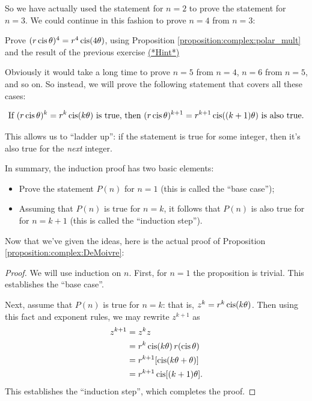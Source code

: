 \noindent So we have actually used the statement for $n=2$ to prove the statement for $n=3$. We could continue in this fashion to prove $n=4$ from $n=3$:

\begin{exercise}{29} Prove $(r\operatorname{cis}\theta)^{4}=r^{4}\operatorname{cis}(4\theta)$, using Proposition
\ref{proposition:complex:polar_mult} and the result of the previous exercise 
\hyperref[sec:complex:hints]{(*Hint*)}
\end{exercise}

 \noindent Obviously it would take a long time to prove $n=5$ from $n=4$, $n=6$ from $n=5$, and so on. So instead, we will prove the following statement that covers all these cases:

\[ \text{If } (r\operatorname{cis}\theta)^{k}=r^{k}\operatorname{cis}(k\theta) \mbox{ is true, then } (r\operatorname{cis}\theta)^{k+1}=r^{k+1}\operatorname{cis}((k+1)\theta) \mbox{ is also true.} \]

This allows us to ``ladder up'': if the statement is true for some integer, then it's also true for the {\it next} integer.

In summary, the induction proof has two basic elements:
\begin{itemize}
\item
Prove the statement $P(n)$ for $n=1$ (this is called the ``base case'');
\item
Assuming that $P(n)$  is true for $n=k$, it follows that $P(n)$  is also true for for $n=k+1$ (this is called the ``induction step'').
\end{itemize}

\noindent Now that we've given the ideas, here is the actual proof  of Proposition \ref{proposition:complex:DeMoivre}:
\medskip{}
\newline
\begin{proof}
We will use induction  on $n$. First, for $n=1$ the proposition
is trivial. This establishes the ``base case''. 

Next, assume that $P(n)$ is true for $n=k$: that is, 
$z^k = r^k \operatorname{cis}(k \theta)$. Then using this fact and exponent rules, we may rewrite $z^{k+1}$ as
\begin{align*}
z^{k+1} & =z^{k}z\\
 & =r^{k}\operatorname{cis}(k\theta)\,r(\operatorname{cis}\theta)\\
 & =r^{k+1}[\operatorname{cis}(k\theta + \theta)]\\
 & =r^{k+1} \operatorname{cis}[(k+1)\theta].
\end{align*}
This establishes the ``induction step'', which completes the proof.
\end{proof}

